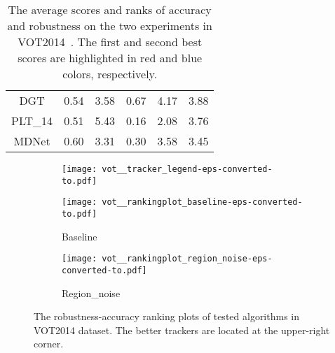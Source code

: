 \documentclass[10pt,twocolumn,letterpaper]{article}
\begin{document}
\begin{table*}
\begin{center}
\begin{subtable}{0.48\textwidth}
\begin{tabular}{c|c c|c c||c}
{DGT} 		& 0.54 & {\color{blue}3.58} & 0.67 & 4.17  & 3.88 \\
{PLT\_14}	& 0.51 & 5.43 & {\color{red}0.16} & {\color{red}2.08}  & {\color{blue}3.76} \\ [1pt] \hline{MDNet}	& {\color{red}0.60} & {\color{red}3.31} & {\color{blue}0.30} & {\color{blue}3.58}  & {\color{red}3.45} \\\hline
\end{tabular}
\vspace{-1mm}
\end{subtable}
\end{center}
\vspace{-5mm}
\caption{The average scores and ranks of accuracy and robustness on the two experiments in VOT2014~\cite{vot14}. The first and second best scores are highlighted in red and blue colors, respectively.}
\label{tab:vot}
\end{table*}

\begin{figure}[t]
\begin{center}
\begin{subfigure}{\linewidth}
\texttt{[image: vot\_\_tracker\_legend-eps-converted-to.pdf]}
\end{subfigure}
\begin{subfigure}{0.49\linewidth}
\texttt{[image: vot\_\_rankingplot\_baseline-eps-converted-to.pdf]}
\caption{Baseline}
\label{fig:otb50}
\end{subfigure}
\begin{subfigure}{0.49\linewidth}
\texttt{[image: vot\_\_rankingplot\_region\_noise-eps-converted-to.pdf]}
\caption{Region\_noise}
\label{fig:otb100}
\end{subfigure}
\end{center}
\vspace{-5mm}
\caption{The robustness-accuracy ranking plots of tested algorithms in VOT2014 dataset. The better trackers are located at the upper-right corner.}
\label{fig:vot}
\end{figure}
\end{document}
